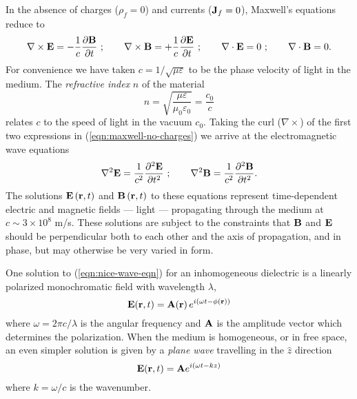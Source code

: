 In the absence of charges ($\rho_f=0$) and currents ($\mathbf{J}_f=0$), Maxwell's equations reduce to
\begin{equation}
    \nabla \times \mathbf{E} = -\frac{1}{c} \frac{\partial \mathbf{B}}{\partial t}~; \qquad
    \nabla \times \mathbf{B} = +\frac{1}{c} \frac{\partial \mathbf{E}}{\partial t}~; \qquad
    \nabla \cdot \mathbf{E} = 0~;\qquad
    \nabla \cdot \mathbf{B} = 0.
    \label{eqn:maxwell-no-charges}
\end{equation}
For convenience we have taken $c=1/\sqrt{\mu\varepsilon}$ to be the phase velocity of light in the medium.  The \emph{refractive index} $n$ of the material 
\begin{equation}
n=\sqrt{\frac{\mu \varepsilon}{\mu_0 \varepsilon_0}} = \frac{c_0}{c}
\end{equation}
relates $c$ to the speed of light in the vacuum $c_0$.
Taking the curl ($\nabla \times$) of the first two expressions in (\ref{eqn:maxwell-no-charges}) we arrive at the electromagnetic wave equations 
\begin{equation}
\nabla ^2 \mathbf{E} = \frac{1}{c^2} \frac{\partial^2 \mathbf{E}}{\partial t^2}  ~; \qquad
\nabla ^2 \mathbf{B} = \frac{1}{c^2} \frac{\partial^2 \mathbf{B}}{\partial t^2}   .
\label{eqn:nice-wave-eqn}
\end{equation}
The solutions $\mathbf{E}\left(\mathbf{r}, t\right)$ and $\mathbf{B}\left(\mathbf{r}, t\right)$ to these equations represent time-dependent electric and magnetic fields --- light --- propagating through the medium at $c \sim 3\times10^8$ m/s. These solutions are subject to the constraints that $\mathbf{B}$ and $\mathbf{E}$ should be perpendicular both to each other and the axis of propagation, and in phase, but may otherwise be very varied in form.  

One solution to (\ref{eqn:nice-wave-eqn}) for an inhomogeneous dielectric is a linearly polarized monochromatic field with wavelength $\lambda$, 
\begin{equation}
\mathbf{E}(\mathbf{r}, t) = \mathbf{A}(\mathbf{r}) \, e^{i \left( \omega t - \phi(\mathbf{r}) \right) }
\label{eqn:linearly-polarized-monochromatic}
\end{equation}
where $\omega=2\pi c / \lambda$ is the angular frequency and $\mathbf{A}$ is the amplitude vector which determines the polarization. 
When the medium is homogeneous, or in free space, an even simpler solution is given by a \emph{plane wave} travelling in the $\hat{z}$ direction
\begin{equation}
\mathbf{E}(\mathbf{r}, t) = \mathbf{A} e^{i \left( \omega t - k z \right) }
\label{eqn:infinite-field}
\end{equation}
where $k=\omega/c$ is the wavenumber.

